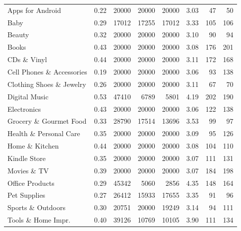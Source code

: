 \begin{table}
\begin{tabularx}{\textwidth}{lXrrrcrr}
        \midrule
        Apps for Android            &   0.22 &   20000 &      20000 & 20000 &    3.03 &     47 &   50 \\
        Baby                        &   0.29 &     17012 &      17255 &      17012 &    3.33 &    105 &  106 \\
        Beauty                      &   0.32 &   20000 &      20000 & 20000 &    3.10 &     90 &   94 \\
        Books                       &   0.43 &   20000 &      20000 & 20000 &    3.08 &    176 &  201 \\
        CDs \& Vinyl                &   0.44 &   20000 &      20000 & 20000 &    3.11 &    172 &  168 \\
        Cell Phones \& Accessories  &   0.19 &   20000 &      20000 & 20000 &    3.06 &     93 &  138 \\
        Clothing Shoes \& Jewelry   &   0.26&   20000 &      20000 & 20000 &    3.11 &     67 &   70 \\
        Digital Music               &   0.53 &  47410 &      6789 &  5801 &    4.19 &    202 &  190 \\
        Electronics                 &   0.43 &   20000 &      20000 & 20000 &    3.06 &    122 &  138 \\
        Grocery \& Gourmet Food     &   0.33 &  28790 & 17514 & 13696 &    3.53 &    99  &   97 \\
        Health \& Personal Care     &   0.35 &   20000 &      20000 & 20000 &    3.09 &     95 &  126 \\
        Home \& Kitchen             &   0.44 &   20000 &      20000 & 20000 &    3.08 &    104 &  110 \\
        Kindle Store                &   0.35 &   20000 &      20000 & 20000 &    3.07 &    111 &  131 \\
        Movies \& TV                &   0.39 &   20000 &      20000 & 20000 &    3.07 &    184 &  198 \\
        Office Products             &   0.29 &  45342 &  5060 & 2856 &    4.35 &    148 &  164 \\
        Pet Supplies                &   0.27 &  26412 & 15933 & 17655 &    3.35 &     91 &   96 \\
        Sports \& Outdoors          &   0.30 &  20751 & 20000 & 19249 &    3.14 &     94 &  111 \\
        Tools \& Home Impr.          &   0.40 &  39126 & 10769 & 10105 &    3.90 &    111 &  134 \\

\end{tabularx}
\end{table}
